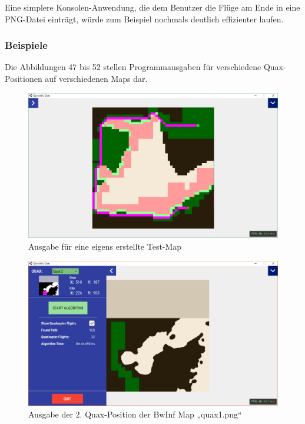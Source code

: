 \documentclass[a4paper,12pt]{article}
\begin{document}
Eine simplere Konsolen-Anwendung, die dem Benutzer die Flüge am Ende in eine PNG-Datei einträgt, würde zum Beispiel nochmals deutlich effizienter laufen.


\subsubsection{Beispiele}
Die Abbildungen 47 bis 52 stellen Programmausgaben für verschiedene Quax-Positionen auf verschiedenen Maps dar.
\begin{figure}[H]
\centering
    \includegraphics[width=1\linewidth]{Bilder/Aufgabe3/Programm/eigen_08.png}
    \caption{Ausgabe für eine eigens erstellte Test-Map}
\end{figure}
\begin{figure}[H]
\centering
    \includegraphics[width=1\linewidth]{Bilder/Aufgabe3/Programm/quax1_02.png}
    \caption{Ausgabe der 2. Quax-Position der BwInf Map „quax1.png“}
\end{figure}
\end{document}
